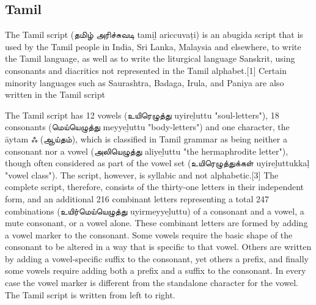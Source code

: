 \subsection{Tamil}
\newfontfamily{}

\def\tamiltext#1{{\tamil#1}}

The Tamil script (\tamiltext{தமிழ் அரிச்சுவடி} tamiḻ ariccuvaṭi) is an abugida script that is used by the Tamil people in India, Sri Lanka, Malaysia and elsewhere, to write the Tamil language, as well as to write the liturgical language Sanskrit, using consonants and diacritics not represented in the Tamil alphabet.[1] Certain minority languages such as Saurashtra, Badaga, Irula, and Paniya are also written in the Tamil script

The Tamil script has 12 vowels (\tamiltext{உயிரெழுத்து} uyireḻuttu "soul-letters"), 18 consonants (\tamiltext{மெய்யெழுத்து} meyyeḻuttu "body-letters") and one character, the āytam \tamiltext{ஃ (ஆய்தம்)}, which is classified in Tamil grammar as being neither a consonant nor a vowel (\tamiltext{அலியெழுத்து} aliyeḻuttu "the hermaphrodite letter"), though often considered as part of the vowel set (\tamiltext{உயிரெழுத்துக்கள்} uyireḻuttukkaḷ "vowel class"). The script, however, is syllabic and not alphabetic.[3] The complete script, therefore, consists of the thirty-one letters in their independent form, and an additional 216 combinant letters representing a total 247 combinations (\tamiltext{உயிர்மெய்யெழுத்து} uyirmeyyeḻuttu) of a consonant and a vowel, a mute consonant, or a vowel alone. These combinant letters are formed by adding a vowel marker to the consonant. Some vowels require the basic shape of the consonant to be altered in a way that is specific to that vowel. Others are written by adding a vowel-specific suffix to the consonant, yet others a prefix, and finally some vowels require adding both a prefix and a suffix to the consonant. In every case the vowel marker is different from the standalone character for the vowel.
The Tamil script is written from left to right.
